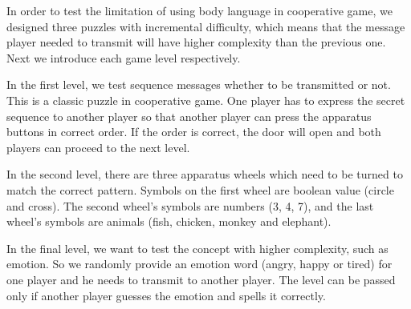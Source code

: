 In order to test the limitation of using body language in cooperative game, we designed three puzzles with incremental difficulty, which means that the message player needed to transmit will have higher complexity than the previous one. Next we introduce each game level respectively.


In the first level, we test sequence messages whether to be transmitted or not. This is a classic puzzle in cooperative game. One player has to express the secret sequence to another player so that another player can press the apparatus buttons in correct order. If the order is correct, the door will open and both players can proceed to the next level.


In the second level, there are three apparatus wheels which need to be turned to match the correct pattern. Symbols on the first wheel are boolean value (circle and cross). The second wheel's symbols are numbers (3, 4, 7), and the last wheel's symbols are animals (fish, chicken, monkey and elephant).


In the final level, we want to test the concept with higher complexity, such as emotion. So we randomly provide an emotion word (angry, happy or tired) for one player and he needs to transmit to another player. The level can be passed only if another player guesses the emotion and spells it correctly.




